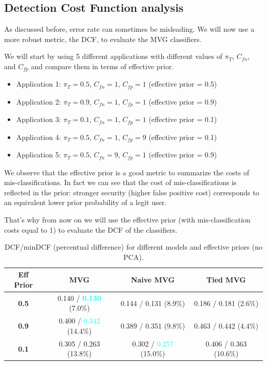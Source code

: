 \documentclass[12pt]{report}
\newcommand{\nl}{%
    \newline
    \noindent
}
\begin{document}
\subsection*{Detection Cost Function analysis}
As discussed before, error rate can sometimes be misleading. We will now use a more robust metric, the DCF, to evaluate the MVG classifiers.
\nl
We will start by using 5 different applications with different values of $\pi_{T}$, $C_{fn}$, and $C_{fp}$ and compare them in terms of effective prior.
\begin{itemize}
    \item Application 1: $\pi_{T} = 0.5$, $C_{fn} = 1$, $C_{fp} = 1$ (effective prior = 0.5)
    \item Application 2: $\pi_{T} = 0.9$, $C_{fn} = 1$, $C_{fp} = 1$ (effective prior = 0.9)
    \item Application 3: $\pi_{T} = 0.1$, $C_{fn} = 1$, $C_{fp} = 1$ (effective prior = 0.1)
    \item Application 4: $\pi_{T} = 0.5$, $C_{fn} = 1$, $C_{fp} = 9$ (effective prior = 0.1)
    \item Application 5: $\pi_{T} = 0.5$, $C_{fn} = 9$, $C_{fp} = 1$ (effective prior = 0.9)
\end{itemize}
\noindent
We observe that the effective prior is a good metric to summarize the costs of mis-classifications. In fact we can see that the cost of mis-classifications is reflected in the prior: stronger security (higher false positive cost) corresponds to an equivalent lower prior probability of a legit user.
\nl
That's why from now on we will use the effective prior (with mis-classification costs equal to 1) to evaluate the DCF of the classifiers.
\begin{table}[H]
    \centering
    \begin{tabular}{|c|c|c|c|}
        \hline
        \rowcolor{blue!10}
        \textbf{Eff Prior} & \textbf{MVG}                                     & \textbf{Naive MVG}                       & \textbf{Tied MVG}      \\
        \hline
        \textbf{0.5}       & 0.140 / \textcolor{cyan}{\textbf{0.130}} (7.0\%) & 0.144 / 0.131 (8.9\%)                    & 0.186 / 0.181 (2.6\%)  \\
        \hline
        \textbf{0.9}       & 0.400 / \textcolor{cyan}{0.342} (14.4\%)         & 0.389 / 0.351 (9.8\%)                    & 0.463 / 0.442 (4.4\%)  \\
        \hline
        \textbf{0.1}       & 0.305 / 0.263 (13.8\%)                           & 0.302 / \textcolor{cyan}{0.257} (15.0\%) & 0.406 / 0.363 (10.6\%) \\
        \hline
    \end{tabular}
    \caption{DCF/minDCF (percentual difference) for different models and effective priors (no PCA).}
    \label{tab:DCF_MVG_PCA_effective_prior}
\end{table}
\end{document}
